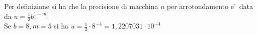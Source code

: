 Per definizione si ha che la precisione di macchina \(u\) per arrotondamento e'\ data da
\(
u=\frac{1}{2} b ^{1-m}
\). \\
Se \(b=8, m=5\) si ha \( u = \frac{1}{2}\cdot 8^{-4} = 1,2207031 \cdot 10^{-4} \)
